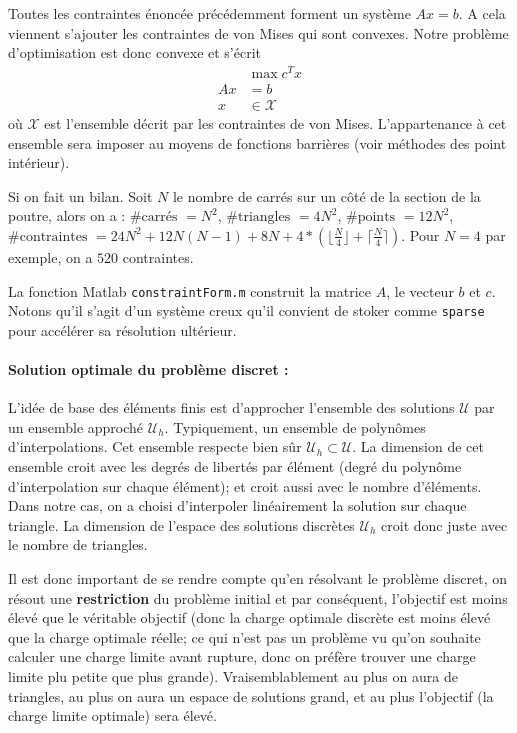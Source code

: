Toutes les contraintes énoncée précédemment forment un système $Ax=b$. A cela viennent s'ajouter les contraintes de von Mises qui sont convexes. Notre problème d'optimisation est donc convexe et s'écrit 
\begin{align*}
& \max c^T x\\
 Ax &= b\\
 x & \in \mathcal{X}
\end{align*}
où $\mathcal{X}$ est l'ensemble décrit par les contraintes de von Mises. L'appartenance à cet ensemble sera imposer au moyens de fonctions barrières (voir méthodes des point intérieur). 

Si on fait un bilan. Soit $N$ le nombre de carrés sur un côté de la section de la poutre, alors on a : $\text{\# carrés  } = N^2$, $\text{\# triangles  } = 4N^2$, $\text{\# points  } = 12 N^2$, $\text{\# contraintes  } = 24N^2+12N(N-1)+8N + 4*\left(  \lfloor \frac{N}{4} \rfloor + \lceil \frac{N}{4} \rceil \right)$.
Pour $N=4$ par exemple, on a $520$ contraintes.

La fonction Matlab \texttt{constraintForm.m} construit la matrice $A$, le vecteur $b$ et $c$. Notons qu'il s'agit d'un système creux qu'il convient de stoker comme \texttt{sparse} pour accélérer sa résolution ultérieur.

\paragraph{Solution optimale du problème discret : } L'idée de base des éléments finis est d'approcher l'ensemble des solutions $\mathcal{U}$ par un ensemble approché $\mathcal{U}_h$. Typiquement, un ensemble de polynômes d'interpolations. Cet ensemble respecte bien sûr $\mathcal{U}_h \subset \mathcal{U}$. La dimension de cet ensemble croit avec les degrés de libertés par élément (degré du polynôme d'interpolation sur chaque élément); et croit aussi avec le nombre d'éléments. Dans notre cas, on a choisi d'interpoler linéairement la solution sur chaque triangle. La dimension de l'espace des solutions discrètes $\mathcal{U}_h$ croit donc juste avec le nombre de triangles. 

Il est donc important de se rendre compte qu'en résolvant le problème discret, on résout une \textbf{restriction} du problème initial et par conséquent, l'objectif est moins élevé que le véritable objectif (donc la charge optimale discrète est moins élevé que la charge optimale réelle; ce qui n'est pas un problème vu qu'on souhaite calculer une charge limite avant rupture, donc on préfère trouver une charge limite plu petite que plus grande). Vraisemblablement au plus on aura de triangles, au plus on aura un espace de solutions grand, et au plus l'objectif (la charge limite optimale) sera élevé.

